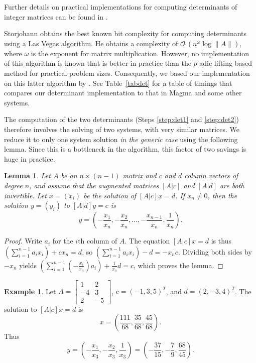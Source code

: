 \documentclass[preprint,12pt]{elsarticle}
\newcommand{\SftO}[1]{\ensuremath{\mathcal{O}\tilde\ \left(#1\right)}\xspace}
\theoremstyle{plain}
\newtheorem{lemma}[theorem]{Lemma}
\theoremstyle{definition}
\newtheorem{example}[theorem]{Example}
\numberwithin{equation}{section}
\numberwithin{figure}{section}
\numberwithin{table}{section}
\begin{document}
Further details on practical implementations for computing determinants of
integer matrices can be found in \cite{DumasUrbanska:2006:TC}.

Storjohann \cite{Storjohann05} obtains the best known bit complexity
for computing determinants using a Las Vegas algorithm.  He obtains a
complexity of \SftO{n^\omega\log\|A\|}, where $\omega$ is the exponent
for matrix multiplication.  However, no implementation of this
algorithm is known that is better in practice than the $p$-adic
lifting based method for practical problem sizes.  Consequently, we
based our implementation on this latter algorithm by \cite{AbbBroMul99}.
See Table~\ref{tabdet} for a table of timings that compares our
determinant implementation to that in Magma and some other systems.

The computation of the two determinants (Steps \ref{step:det1} and
\ref{step:det2}) therefore involves the solving of two systems, with
very similar matrices. We reduce it to only one system solution {\em
  in the generic case} using the following lemma.  Since this is a
bottleneck in the algorithm, this factor of two savings is huge in
practice.

\begin{lemma}\label{lem:doubledet}
  Let $A$ be an $n\times(n-1)$ matrix and $c$ and $d$ column vectors of
 degree $n$, and assume that the augmented matrices 
$[A|c]$
and 
$[A|d]$
are both invertible. 
Let $x=(x_i)$ be the solution of 
$[A | c] x = d$.
If $x_{n} \neq 0$, then the solution $y=(y_i)$ to $[A|d]y = c$ is 
$$
  y = \left( -\frac{x_1}{x_n}, -\frac{x_2}{x_n}, \dots, -\frac{x_{n-1}}{x_n},
          \frac{1}{x_n}\right).
$$
\end{lemma}
\begin{proof}
Write $a_i$ for the $i$th column of $A$.  The equation $[A|c]x = d$ is thus
$\left( \sum_{i=1}^{n-1} a_i x_i\right) + c x_n = d$, so 
$\left(\sum_{i=1}^{n-1} a_i x_i\right) - d = -x_n c$. Dividing both sides by $-x_n$ yields
$\left(\sum_{i=1}^{n-1} \left(-\frac{x_i}{x_n}\right) a_i\right)
    + \frac{1}{x_n} d = c$, which proves the lemma.
\end{proof}
\begin{example}
Let $A=\begin{bmatrix}
1 & 2 \\
-4 & 3 \\
2 & -5
\end{bmatrix}$,  $c=(-1,3,5)^T$,
and $d=(2,-3,4)^T$. 
The solution to $[A|c]x = d$ is 
$$x = \left(\frac{111}{68},\frac{35}{68},\frac{45}{68}\right).$$
Thus 
$$
 y = \left(-\frac{x_1 }{x_3}, -\frac{x_2}{x_3}, \frac{1}{x_3}\right)
= \left(-\frac{37}{15},-\frac{7}{9},\frac{68}{45}\right).
$$
\end{example}
\end{document}
